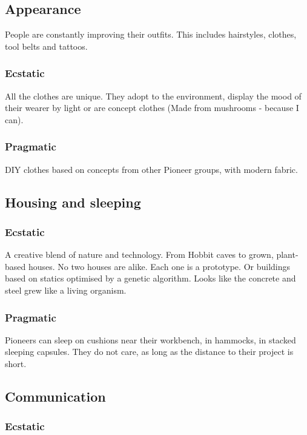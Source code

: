 \subsection{Appearance}

People are constantly improving their outfits. This includes hairstyles, clothes, tool belts and tattoos.

\subsubsection{Ecstatic}

All the clothes are unique. They adopt to the environment, display the mood of their wearer by light or are concept clothes (Made from mushrooms - because I can).

\subsubsection{Pragmatic}

DIY clothes based on concepts from other Pioneer groups, with modern fabric.

\subsection{Housing and sleeping}


\subsubsection{Ecstatic}

A creative blend of nature and technology. From Hobbit caves to grown, plant-based houses. No two houses are alike. Each one is a prototype.
Or buildings based on statics optimised by a genetic algorithm. Looks like the concrete and steel grew like a living organism.

\subsubsection{Pragmatic}

Pioneers can sleep on cushions near their workbench, in hammocks, in stacked sleeping capsules. They do not care, as long as the distance to their project is short.

\subsection{Communication}


\subsubsection{Ecstatic}

